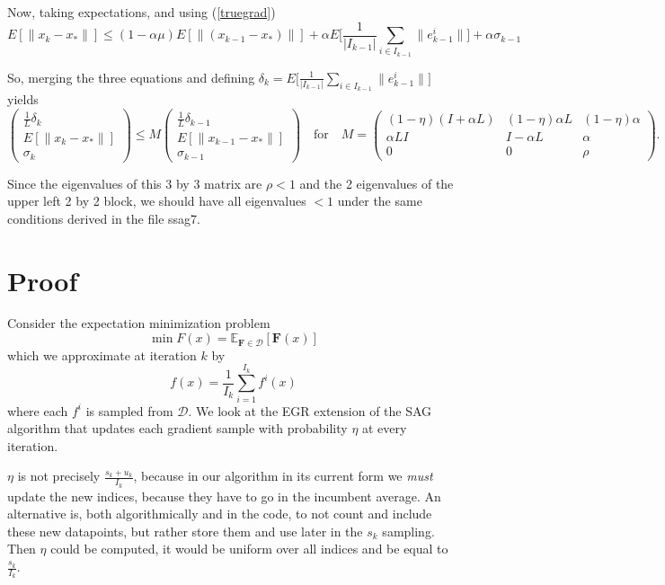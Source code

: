 \documentclass[11pt]{article}
\begin{document}
	Now, taking expectations, and using (\ref{truegrad})
	\[  
	E[\| x_k-x_\ast \| ] \leq (1-\alpha \mu)E[\|(x_{k-1}-x_\ast)\| ]+\alpha E[ \frac{1}{|I_{k-1}|} \sum_{i\in I_{k-1}}{\|e_{k-1}^i\|] }+ \alpha \sigma_{k-1}
	\]

	\bigskip

	\noindent  
	So, merging the three equations and defining $\delta_k = E[ \frac{1}{|I_{k-1}|} \sum_{i\in I_{k-1}}{\|e_{k-1}^i\|] }$ yields
	\[
	 \begin{pmatrix} \displaystyle\frac{1}{L}\delta_k\\ E[\|x_k-x_\ast \|] \\ \sigma_k \end{pmatrix} 
	\leq M
	 \begin{pmatrix} \displaystyle\frac{1}{L}\delta_{k-1} \\E [\| x_{k-1}-x_\ast \| ] \\ \sigma_{k-1} \end{pmatrix}  \quad\mbox{for}\quad 
	 M = \begin{pmatrix} (1-\eta)(I+\alpha L) &  (1-\eta)\alpha L & (1-\eta) \alpha\\  
	                   \alpha LI  & I-\alpha L  &  \alpha  \\
	                   0 & 0 &  \rho \end{pmatrix}.                   
	\]

	\bigskip
	Since the eigenvalues of this 3 by 3 matrix are $\rho <1$ and the 2 eigenvalues of the upper left 2 by 2 block,
	we should have all eigenvalues $<1$ under the same conditions derived in the file ssag7.
	
\newpage

	\section{Proof}
    Consider the expectation minimization problem
	\[
		\min F(x) = \mathbb{E}_{\mathbf{F} \in \mathcal{D}} [ \mathbf{F}(x) ]
	\]
	which we approximate at iteration $k$ by 
	\[
		f(x) = \frac{1}{I_k} \sum_{i=1}^{I_k} f^i(x)
	\]
	where each $f^i$ is sampled from $\mathcal{D}$. We look at the EGR extension of the SAG algorithm that updates each gradient sample with probability $\eta$ at every iteration. 
	
	$\eta$ is not precisely $\frac{s_k+u_k}{I_k}$, because in our algorithm in its current form we \textit{must} update the new indices, because they have to go in the incumbent average. An alternative is, both algorithmically and in the code, to not count and include these new datapoints, but rather store them and use later in the $s_k$ sampling. Then $\eta$ could be computed, it would be uniform over all indices and be equal to $\frac{s_k}{I_k}$.
	
\end{document}
